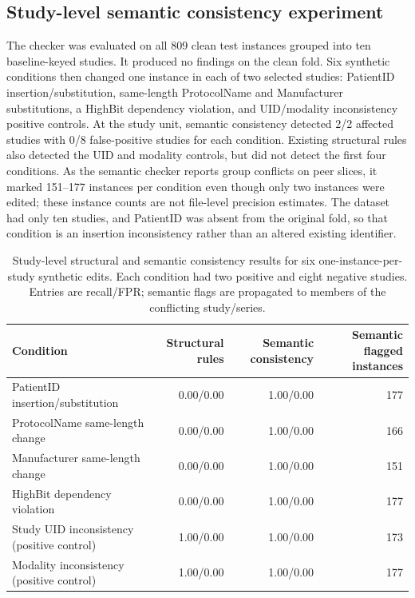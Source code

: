 \documentclass[journal]{IEEEtran}
\begin{document}
  \subsection{Study-level semantic consistency experiment}
  The checker was evaluated on all 809 clean test instances grouped into ten baseline-keyed studies. It produced no findings on the clean fold. Six synthetic conditions then changed one instance in each of two selected studies: PatientID insertion/substitution, same-length ProtocolName and Manufacturer substitutions, a HighBit dependency violation, and UID/modality inconsistency positive controls. At the study unit, semantic consistency detected 2/2 affected studies with 0/8 false-positive studies for each condition. Existing structural rules also detected the UID and modality controls, but did not detect the first four conditions. As the semantic checker reports group conflicts on peer slices, it marked 151--177 instances per condition even though only two instances were edited; these instance counts are not file-level precision estimates. The dataset had only ten studies, and PatientID was absent from the original fold, so that condition is an insertion inconsistency rather than an altered existing identifier.
  
  \begin{table}[t]
  \caption{Study-level structural and semantic consistency results for six one-instance-per-study synthetic edits. Each condition had two positive and eight negative studies. Entries are recall/FPR; semantic flags are propagated to members of the conflicting study/series.}
  \label{tab:semantic}
  \centering\footnotesize
  \begin{tabular}{lrrr}
  \toprule
  Condition & Structural rules & Semantic consistency & Semantic flagged instances \\
  \midrule
  PatientID insertion/substitution & 0.00/0.00 & 1.00/0.00 & 177 \\
  ProtocolName same-length change & 0.00/0.00 & 1.00/0.00 & 166 \\
  Manufacturer same-length change & 0.00/0.00 & 1.00/0.00 & 151 \\
  HighBit dependency violation & 0.00/0.00 & 1.00/0.00 & 177 \\
  Study UID inconsistency (positive control) & 1.00/0.00 & 1.00/0.00 & 173 \\
  Modality inconsistency (positive control) & 1.00/0.00 & 1.00/0.00 & 177 \\
  \bottomrule
  \end{tabular}
  \end{table}
\end{document}
